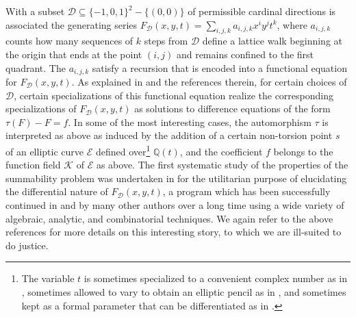 \documentclass[preprint,12pt]{elsarticle}
\numberwithin{equation}{section} %
\theoremstyle{theorem}
\theoremstyle{definition}
\newcommand{\bk}{\mathcal{K}} %
\newcommand{\ec}{\mathcal{E}} %
\begin{document}
With a subset $\mathcal{D}\subseteq \{-1,0,1\}^2-\{(0,0)\}$ of permissible cardinal directions is associated the generating series $F_\mathcal{D}(x,y,t)=\sum_{i,j,k}a_{i,j,k}x^iy^jt^k$, where $a_{i,j,k}$ counts how many sequences of $k$ steps from $\mathcal{D}$ define a lattice walk beginning at the origin that ends at the point $(i,j)$ and remains confined to the first quadrant. The $a_{i,j,k}$ satisfy a recursion that is encoded into a functional equation for $F_\mathcal{D}(x,y,t)$. As explained in \cite{Dreyfus2018,Hardouin2021,dreyfus-hardouin:2021,dreyfus:2023} and the references therein, for certain choices of $\mathcal{D}$, certain specializations of this functional equation realize the corresponding specializations of $F_\mathcal{D}(x,y,t)$ as solutions to difference equations of the form $\tau(F)-F=f$. In some of the most interesting cases, the automorphism $\tau$ is interpreted as above as induced by the addition of a certain non-torsion point $s$ of an elliptic curve $\ec$ defined over\footnote{%
The variable $t$ is sometimes specialized to a convenient complex number as in \cite{Dreyfus2018}, sometimes allowed to vary to obtain an elliptic pencil as in \cite{Hardouin2021}, and sometimes kept as a formal parameter that can be differentiated as in \cite{dreyfus-hardouin:2021,dreyfus:2023}.} $\mathbb{Q}(t)$, and the coefficient $f$ belongs to the function field $\bk$ of $\ec$ as above. The first systematic study of the properties of the summability problem  was undertaken in \cite[Appendix~B]{Dreyfus2018} for the utilitarian purpose of elucidating the differential nature of $F_\mathcal{D}(x,y,t)$, a program which has been successfully continued in \cite{Dreyfus2018,Hardouin2021,dreyfus-hardouin:2021,dreyfus:2023} and by many other authors over a long time using a wide variety of algebraic, analytic, and combinatorial techniques. We again refer to the above references for more details on this interesting story, to which we are ill-suited to do justice.
\end{document}
